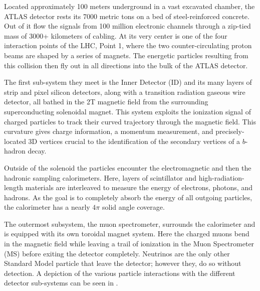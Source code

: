 Located approximately 100 meters underground in a vast excavated chamber, the
ATLAS detector rests its 7000 metric tons on a bed of steel-reinforced
concrete.  Out of it flow the signals from 100 million electronic channels
through a zip-tied mass of 3000+ kilometers of cabling.  At its very center is
one of the four interaction points of the LHC, Point 1, where the
two counter-circulating proton beams are shaped by a
series of magnets.  The energetic particles resulting from this collision then
fly out in all directions into the bulk of the ATLAS detector.

The first sub-system they meet is the Inner Detector (ID) and its many layers
of strip and pixel silicon detectors, along with a transition radiation gaseous
wire detector, all bathed in the 2T magnetic field from the surrounding
superconducting solenoidal magnet.  This system exploits the ionization signal
of charged particles to track their curved trajectory through the magnetic
field.  This curvature gives charge information, a momentum measurement, and
precisely-located 3D vertices crucial to the identification of the secondary
vertices of a $b$-hadron decay. 

Outside of the solenoid the particles encounter the electromagnetic and then
the hadronic sampling calorimeters. Here, layers of scintillator and
high-radiation-length materials are interleaved to measure the energy of
electrons, photons, and hadrons. As the goal is to completely absorb the energy
of all outgoing particles, the calorimeter has a nearly $4\pi$ solid angle
coverage.

The outermost subsystem, the muon spectrometer, surrounds the calorimeter and
is equipped with its own toroidal magnet system.  Here the charged muons bend
in the magnetic field while leaving a trail of ionization in the Muon
Spectrometer (MS) before exiting the detector completely.  Neutrinos are the
only other Standard Model particle that leave the detector; however they, do so
without detection.  A depiction of the various particle interactions with the
different detector sub-systems can be seen in .


